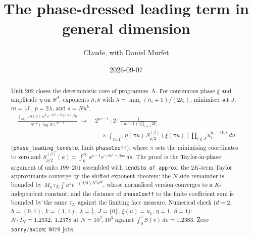 \documentclass[11pt]{article}
\title{The phase-dressed leading term in general dimension}
\author{Claude, with Daniel Murfet}
\date{2026-09-07}
\begin{document}
\maketitle
\sloppy

\begin{abstract}
Unit 202 closes the deterministic core of programme~A. For continuous phase $\xi$ and amplitude
$\eta$ on $\mathbb R^d$, exponents $h,k$ with $\lambda=\min_i(h_i+1)/(2k_i)$, minimiser set $J$,
$m=|J|$, $p=2\lambda$, and $s=Nu^k$,
\begin{align*}
\frac{\int_{(0,1]^d}\eta(u)\,u^h\,e^{-\beta s^2+\beta s\,\xi(u)}\,du}{N^{-p}(\log N)^{m-1}}
\;\longrightarrow\;
&2^{m-1}\cdot2\cdot\frac{1}{(m-1)!\prod_{i\in J}2k_i}\\
&\quad\times\int_{(0,1]^d}\eta(\pi u)\,S^{(\beta)}_{p/2}(\xi(\pi u))\prod_{i\notin J}u_i^{h_i-2k_i\lambda}\,du
\end{align*}
(\texttt{phase\_leading\_tendsto}, limit \texttt{phaseCoeff}), where $\pi$ sets the minimising
coordinates to zero and $S^{(\beta)}_{p/2}(a)=\int_0^\infty s^{p-1}e^{-\beta s^2+\beta as}\,ds$. The
proof is the Taylor-in-phase argument of units 199--201 assembled with \texttt{tendsto\_of\_approx}:
the $2K$-term Taylor approximants converge by the shifted-exponent theorem; the $N$-side remainder is
bounded by $M_\eta\,\tau_K\int u^he^{-(\beta/4)N^2u^{2k}}$, whose normalised version converges to a
$K$-independent constant; and the distance of \texttt{phaseCoeff} to the finite coefficient sum is
bounded by the same $\tau_K$ against the limiting face measure. Numerical check ($d=2$,
$h=(0,1)$, $k=(1,1)$, $\lambda=\tfrac12$, $J=\{0\}$, $\xi(u)=u_1$, $\eta=1$, $\beta=1$):
$N\cdot I_N=1.2332,\ 1.2378$ at $N=10^2,10^3$ against $\int_0^1S(v)\,dv=1.2383$. Zero
\texttt{sorry}/\texttt{axiom}; 9079 jobs.
\end{abstract}
\end{document}

